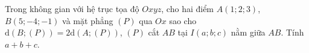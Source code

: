 \begin{ex} %
Trong không gian với hệ trục tọa độ $Oxyz$, cho hai điểm $A \left(1;2;3\right)$, $B\left(5;-4;-1\right)$ và mặt phẳng $\left(P\right)$ qua $Ox$ sao cho $\mathrm{d} \left(B;\left(P\right)\right) = 2\mathrm{d} \left(A;\left(P\right)\right)$, $\left(P\right)$ cắt $AB$ tại $I\left(a;b;c\right)$ nằm giữa $AB$. Tính $a+b+c$.
\end{ex}

